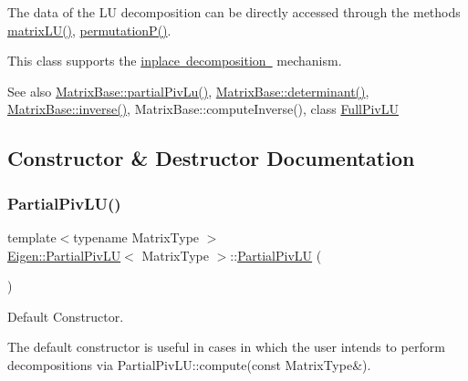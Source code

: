 The data of the LU decomposition can be directly accessed through the methods \mbox{\hyperlink{class_eigen_1_1_partial_piv_l_u_abea0d7e51c5591a6db152eade0892d9c}{matrix\+L\+U()}}, \mbox{\hyperlink{class_eigen_1_1_partial_piv_l_u_a1c637530b3215787668a75ebb2e7b882}{permutation\+P()}}.

This class supports the \mbox{\hyperlink{}{inplace decomposition }} mechanism.

\begin{DoxySeeAlso}{See also}
\mbox{\hyperlink{class_eigen_1_1_matrix_base_a6199d8aaf26c1b8ac3097fdfa7733a1e}{Matrix\+Base\+::partial\+Piv\+Lu()}}, \mbox{\hyperlink{class_eigen_1_1_matrix_base_a7ad8f77004bb956b603bb43fd2e3c061}{Matrix\+Base\+::determinant()}}, \mbox{\hyperlink{class_eigen_1_1_matrix_base_a7712eb69e8ea3c8f7b8da1c44dbdeebf}{Matrix\+Base\+::inverse()}}, Matrix\+Base\+::compute\+Inverse(), class \mbox{\hyperlink{class_eigen_1_1_full_piv_l_u}{Full\+Piv\+LU}} 
\end{DoxySeeAlso}


\subsection{Constructor \& Destructor Documentation}
\mbox{\label{class_eigen_1_1_partial_piv_l_u_a5c04818d354f94a98786d8a44cb709c6}} 
\subsubsection{\texorpdfstring{PartialPivLU()}{PartialPivLU()}\hspace{0.1cm}{\footnotesize\ttfamily [1/4]}}
{\footnotesize\ttfamily template$<$typename Matrix\+Type $>$ \\
\mbox{\hyperlink{class_eigen_1_1_partial_piv_l_u}{Eigen\+::\+Partial\+Piv\+LU}}$<$ Matrix\+Type $>$\+::\mbox{\hyperlink{class_eigen_1_1_partial_piv_l_u}{Partial\+Piv\+LU}} (\begin{DoxyParamCaption}{ }\end{DoxyParamCaption})}



Default Constructor. 

The default constructor is useful in cases in which the user intends to perform decompositions via Partial\+Piv\+L\+U\+::compute(const Matrix\+Type\&). \mbox{\label{class_eigen_1_1_partial_piv_l_u_acf892c12d8a229b32bddc3149e32e63a}} 
